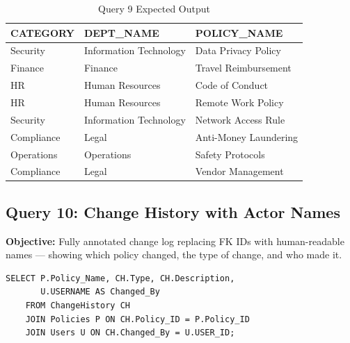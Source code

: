 \documentclass[conference]{IEEEtran}
\begin{document}
\begin{table}[H]
\centering
\caption{Query 9 Expected Output}
\begin{tabular}{|l|l|l|}
\hline
\textbf{CATEGORY} & \textbf{DEPT\_NAME} & \textbf{POLICY\_NAME} \\
\hline
Security    & Information Technology & Data Privacy Policy   \\
Finance     & Finance                & Travel Reimbursement  \\
HR          & Human Resources        & Code of Conduct       \\
HR          & Human Resources        & Remote Work Policy    \\
Security    & Information Technology & Network Access Rule   \\
Compliance  & Legal                  & Anti-Money Laundering \\
Operations  & Operations             & Safety Protocols      \\
Compliance  & Legal                  & Vendor Management     \\
\hline
\end{tabular}
\end{table}

\subsection{Query 10: Change History with Actor Names}

\textbf{Objective:} Fully annotated change log replacing FK IDs with human-readable names — showing which policy changed, the type of change, and who made it.

\begin{lstlisting}[style=sqlstyle, caption={Query 10: Change Log with Names (Multi-JOIN)}]
SELECT P.Policy_Name, CH.Type, CH.Description,
       U.USERNAME AS Changed_By
    FROM ChangeHistory CH
    JOIN Policies P ON CH.Policy_ID = P.Policy_ID
    JOIN Users U ON CH.Changed_By = U.USER_ID;
\end{lstlisting}
\end{document}
